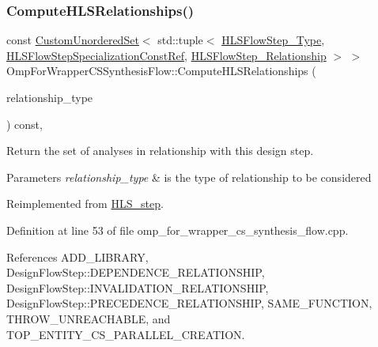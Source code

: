 \subsubsection{\texorpdfstring{Compute\+H\+L\+S\+Relationships()}{ComputeHLSRelationships()}}
{\footnotesize\ttfamily const \hyperlink{classCustomUnorderedSet}{Custom\+Unordered\+Set}$<$ std\+::tuple$<$ \hyperlink{hls__step_8hpp_ada16bc22905016180e26fc7e39537f8d}{H\+L\+S\+Flow\+Step\+\_\+\+Type}, \hyperlink{hls__step_8hpp_a5fdd2edf290c196531d21d68e13f0e74}{H\+L\+S\+Flow\+Step\+Specialization\+Const\+Ref}, \hyperlink{hls__step_8hpp_a3ad360b9b11e6bf0683d5562a0ceb169}{H\+L\+S\+Flow\+Step\+\_\+\+Relationship} $>$ $>$ Omp\+For\+Wrapper\+C\+S\+Synthesis\+Flow\+::\+Compute\+H\+L\+S\+Relationships (\begin{DoxyParamCaption}\item[{const \hyperlink{classDesignFlowStep_a723a3baf19ff2ceb77bc13e099d0b1b7}{Design\+Flow\+Step\+::\+Relationship\+Type}}]{relationship\+\_\+type }\end{DoxyParamCaption}) const\hspace{0.3cm}{\ttfamily [protected]}, {\ttfamily [virtual]}}



Return the set of analyses in relationship with this design step. 


\begin{DoxyParams}{Parameters}
{\em relationship\+\_\+type} & is the type of relationship to be considered \\
\hline
\end{DoxyParams}


Reimplemented from \hyperlink{classHLS__step_aed0ce8cca9a1ef18e705fc1032ad4de5}{H\+L\+S\+\_\+step}.



Definition at line 53 of file omp\+\_\+for\+\_\+wrapper\+\_\+cs\+\_\+synthesis\+\_\+flow.\+cpp.



References A\+D\+D\+\_\+\+L\+I\+B\+R\+A\+RY, Design\+Flow\+Step\+::\+D\+E\+P\+E\+N\+D\+E\+N\+C\+E\+\_\+\+R\+E\+L\+A\+T\+I\+O\+N\+S\+H\+IP, Design\+Flow\+Step\+::\+I\+N\+V\+A\+L\+I\+D\+A\+T\+I\+O\+N\+\_\+\+R\+E\+L\+A\+T\+I\+O\+N\+S\+H\+IP, Design\+Flow\+Step\+::\+P\+R\+E\+C\+E\+D\+E\+N\+C\+E\+\_\+\+R\+E\+L\+A\+T\+I\+O\+N\+S\+H\+IP, S\+A\+M\+E\+\_\+\+F\+U\+N\+C\+T\+I\+ON, T\+H\+R\+O\+W\+\_\+\+U\+N\+R\+E\+A\+C\+H\+A\+B\+LE, and T\+O\+P\+\_\+\+E\+N\+T\+I\+T\+Y\+\_\+\+C\+S\+\_\+\+P\+A\+R\+A\+L\+L\+E\+L\+\_\+\+C\+R\+E\+A\+T\+I\+ON.

